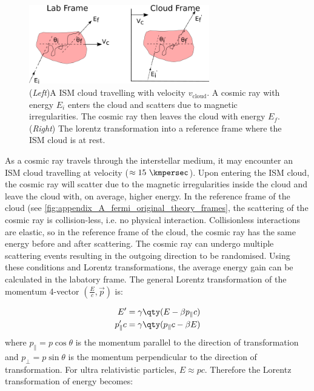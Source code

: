 
\begin{figure}
	\centering
	\includegraphics[width=0.7\textwidth]{A1_Supernova_Remnants/Images/fermi_original_theory_frames.png}
	\caption{(\textit{Left})A ISM cloud travelling with velocity $v_\text{cloud}$. A cosmic ray with energy $E_i$ enters the cloud and scatters due to magnetic irregularities. The cosmic ray then leaves the cloud with energy $E_f$. (\textit{Right}) The lorentz transformation into a reference frame where the ISM cloud is at rest.}
	\label{fig:appendix_A_fermi_original_theory_frames}
\end{figure}

As a cosmic ray travels through the interstellar medium, it may encounter an ISM cloud travelling at velocity ($\approx 15~\kmpersec$). Upon entering the ISM cloud, the cosmic ray will scatter due to the magnetic irregularities inside the cloud and leave the cloud with, on average, higher energy. In the reference frame of the cloud (see \autoref{fig:appendix_A_fermi_original_theory_frames}, the scattering of the cosmic ray is collision-less, i.e. no physical interaction. Collisionless interactions are elastic, so in the reference frame of the cloud, the cosmic ray has the same energy before and after scattering. The cosmic ray can undergo multiple scattering events resulting in the outgoing direction to be randomised. Using these conditions and Lorentz transformations, the average energy gain can be calculated in the labatory frame. The general Lorentz transformation of the momentum 4-vector $(\frac{E}{c},\vec{p})$ is:

\begin{equation}
    \begin{aligned}
    E'&=\gamma\qty(E-\beta p_\parallel c) \\
	p_\parallel ' c&=\gamma\qty(p_\parallel c-\beta E) \\
    \end{aligned}
\end{equation}
\noindent where $p_\parallel=p\cos\theta$ is the momentum parallel to the direction of transformation and $p_\perp=p\sin\theta$ is the momentum perpendicular to the direction of transformation. For ultra relativistic particles, $E\approx pc$. Therefore the Lorentz transformation of energy becomes:

